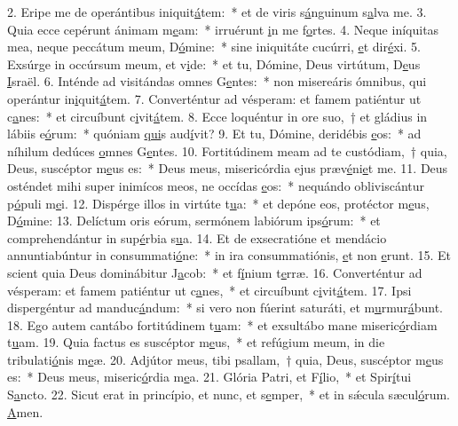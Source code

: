 2. Eripe me de operántibus iniquit\uline{á}tem:~* et de viris s\uline{á}nguinum s\uline{a}lva me.
3. Quia ecce cepérunt ánimam m\uline{e}am:~* irruérunt \uline{i}n me f\uline{o}rtes.
4. Neque iníquitas mea, neque peccátum meum, D\uline{ó}mine:~* sine iniquitáte cucúrri, \uline{e}t dir\uline{é}xi.
5. Exsúrge in occúrsum meum, et v\uline{i}de:~* et tu, Dómine, Deus virtútum, D\uline{e}us \uline{I}sraël.
6. Inténde ad visitándas omnes G\uline{e}ntes:~* non misereáris ómnibus, qui operántur in\uline{i}quit\uline{á}tem.
7. Converténtur ad vésperam: et famem patiéntur ut c\uline{a}nes:~* et circuíbunt c\uline{i}vit\uline{á}tem.
8. Ecce loquéntur in ore suo,~† et gládius in lábiis e\uline{ó}rum:~* quóniam \uline{qui}s aud\uline{í}vit?
9. Et tu, Dómine, deridébis \uline{e}os:~* ad níhilum dedúces \uline{o}mnes G\uline{e}ntes.
10. Fortitúdinem meam ad te custódiam,~† quia, Deus, suscéptor m\uline{e}us es:~* Deus meus, misericórdia ejus præv\uline{é}ni\uline{e}t me.
11. Deus osténdet mihi super inimícos meos, ne occídas \uline{e}os:~* nequándo obliviscántur p\uline{ó}puli m\uline{e}i.
12. Dispérge illos in virtúte t\uline{u}a:~* et depóne eos, protéctor m\uline{e}us, D\uline{ó}mine:
13. Delíctum oris eórum, sermónem labiórum ips\uline{ó}rum:~* et comprehendántur in sup\uline{é}rbia s\uline{u}a.
14. Et de exsecratióne et mendácio annuntiabúntur in consummati\uline{ó}ne:~* in ira consummatiónis, \uline{e}t non \uline{e}runt.
15. Et scient quia Deus dominábitur J\uline{a}cob:~* et f\uline{í}nium t\uline{e}rræ.
16. Converténtur ad vésperam: et famem patiéntur ut c\uline{a}nes,~* et circuíbunt c\uline{i}vit\uline{á}tem.
17. Ipsi dispergéntur ad manduc\uline{á}ndum:~* si vero non fúerint saturáti, et m\uline{u}rmur\uline{á}bunt.
18. Ego autem cantábo fortitúdinem t\uline{u}am:~* et exsultábo mane miseric\uline{ó}rdiam t\uline{u}am.
19. Quia factus es suscéptor m\uline{e}us,~* et refúgium meum, in die tribulati\uline{ó}nis m\uline{e}æ.
20. Adjútor meus, tibi psallam,~† quia, Deus, suscéptor m\uline{e}us es:~* Deus meus, miseric\uline{ó}rdia m\uline{e}a.
21. Glória Patri, et F\uline{í}lio,~* et Spir\uline{í}tui S\uline{a}ncto.
22. Sicut erat in princípio, et nunc, et s\uline{e}mper,~* et in sǽcula sæcul\uline{ó}rum. \uline{A}men.
